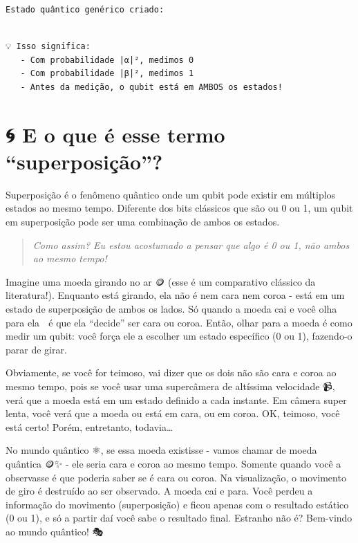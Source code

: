 \documentclass[
  brazilian,
]{report}
\begin{document}
\begin{verbatim}
Estado quântico genérico criado:
\end{verbatim}

\begin{verbatim}

💡 Isso significa:
   - Com probabilidade |α|², medimos 0
   - Com probabilidade |β|², medimos 1
   - Antes da medição, o qubit está em AMBOS os estados!
\end{verbatim}

\section{🌀 E o que é esse termo
``superposição''?}\label{e-o-que-uxe9-esse-termo-superposiuxe7uxe3o}

Superposição é o fenômeno quântico onde um qubit pode existir em
múltiplos estados ao mesmo tempo. Diferente dos bits clássicos que são
ou 0 ou 1, um qubit em superposição pode ser uma combinação de ambos os
estados.

\begin{quote}
\emph{Como assim? Eu estou acostumado a pensar que algo é 0 ou 1, não
ambos ao mesmo tempo!} 🤔
\end{quote}

Imagine uma moeda girando no ar 🪙 (esse é um comparativo clássico da
literatura!). Enquanto está girando, ela não é nem cara nem coroa - está
em um estado de superposição de ambos os lados. Só quando a moeda cai e
você olha para ela 👀 é que ela ``decide'' ser cara ou coroa. Então,
olhar para a moeda é como medir um qubit: você força ele a escolher um
estado específico (0 ou 1), fazendo-o parar de girar.

Obviamente, se você for teimoso, vai dizer que os dois não são cara e
coroa ao mesmo tempo, pois se você usar uma supercâmera de altíssima
velocidade 📹, verá que a moeda está em um estado definido a cada
instante. Em câmera super lenta, você verá que a moeda ou está em cara,
ou em coroa. OK, teimoso, você está certo! Porém, entretanto,
todavia\ldots{}

No mundo quântico ⚛️, se essa moeda existisse - vamos chamar de moeda
quântica 🪙✨ - ele seria cara e coroa ao mesmo tempo. Somente quando
você a observasse é que poderia saber se é cara ou coroa. Na
visualização, o movimento de giro é destruído ao ser observado. A moeda
cai e para. Você perdeu a informação do movimento (superposição) e ficou
apenas com o resultado estático (0 ou 1), e só a partir daí você sabe o
resultado final. Estranho não é? Bem-vindo ao mundo quântico! 🎭
\end{document}
